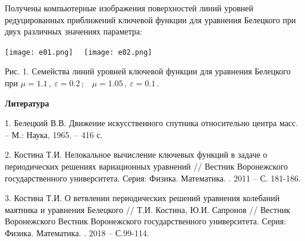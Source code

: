 Получены  компьютерные изображения поверхностей линий уровней
редуцированных приближений ключевой функции для уравнения Белецкого при двух различных значениях параметра:

\begin{center}
\texttt{[image: e01.png]} \ \
\texttt{[image: e02.png]}

Рис. 1. Семейства линий уровней  ключевой функции  для уравнения Белецкого при {$\mu
= 1.1\,, \ \varepsilon=0.2\,;$ \ $\mu = 1.05\,, \
\varepsilon=0.1\,. $}

\end{center}






\smallskip \centerline {\bf Литература} \nopagebreak

1. Белецкий В.В. Движение искусственного спутника относительно центра масс.
-- М.: Наука, 1965. -- 416 с.


2. Костина Т.И. Нелокальное вычисление ключевых функций в задаче о
периодических решениях вариационных уравнений // Вестник
Воронежского государственного университета. Серия: Физика.
Математика. . 2011 -- С. 181-186.


3. Костина Т.И. О ветвлении периодических решений уравнения  колебаний маятника и уравнения Белецкого // Т.И. Костина, Ю.И. Сапронов // Вестник Воронежского Вестник
Воронежского государственного университета. Серия: Физика.
Математика. \No 1. 2018 -- С.99-114.



% 